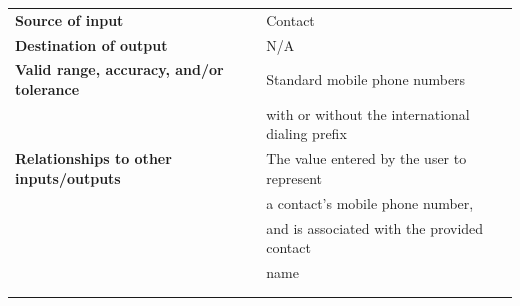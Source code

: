 \begin{tabular}{ll}
\textbf{Source of input}&Contact\\
\textbf{Destination of output}&N/A\\
\textbf{Valid range, accuracy, and/or tolerance}&Standard mobile phone numbers\\&with or without the international dialing prefix\\
\textbf{Relationships to other inputs/outputs}&The value entered by the user to represent\\& a contact's mobile phone number,\\&and is associated with the provided contact\\& name\\
&\\
&\\
\end{tabular}
\newpage
